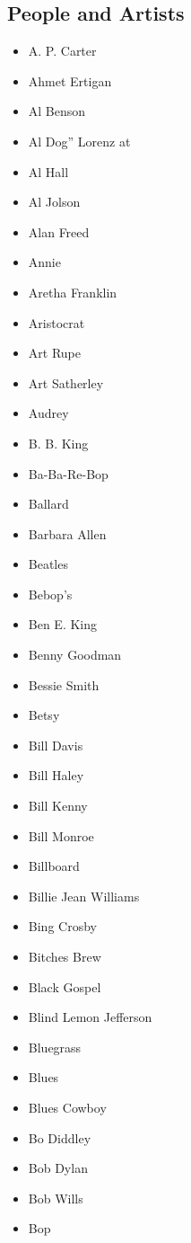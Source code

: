 \documentclass[12pt,a4paper]{article}
\begin{document}
\subsection{People and Artists}
\begin{itemize}
  \item A. P. Carter
  \item Ahmet Ertigan
  \item Al Benson
  \item Al Dog'' Lorenz at
  \item Al Hall
  \item Al Jolson
  \item Alan Freed
  \item Annie
  \item Aretha Franklin
  \item Aristocrat
  \item Art Rupe
  \item Art Satherley
  \item Audrey
  \item B. B. King
  \item Ba-Ba-Re-Bop
  \item Ballard
  \item Barbara Allen
  \item Beatles
  \item Bebop's
  \item Ben E. King
  \item Benny Goodman
  \item Bessie Smith
  \item Betsy
  \item Bill Davis
  \item Bill Haley
  \item Bill Kenny
  \item Bill Monroe
  \item Billboard
  \item Billie Jean Williams
  \item Bing Crosby
  \item Bitches Brew
  \item Black Gospel
  \item Blind Lemon Jefferson
  \item Bluegrass
  \item Blues
  \item Blues Cowboy
  \item Bo Diddley
  \item Bob Dylan
  \item Bob Wills
  \item Bop

\end{itemize}
\end{document}

